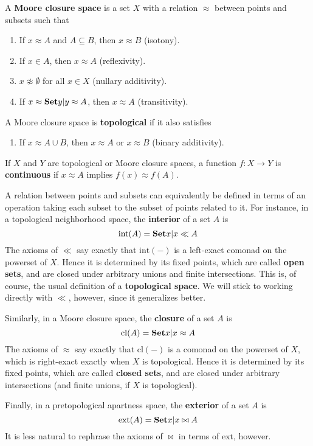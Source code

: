 \documentclass{article}
\def\napprox{\not\approx}
\def\int{\mathrm{int}}
\def\ext{\mathrm{ext}}
\def\cl{\mathrm{cl}}
\begin{document}
\begin{defn}
  A \textbf{Moore closure space} is a set $X$ with a relation $\approx$ between points and subsets such that
  \begin{enumerate}
  \item If $x\approx A$ and $A\subseteq B$, then $x\approx B$ (isotony).
  \item If $x\in A$, then $x\approx A$ (reflexivity).
  \item $x\napprox \emptyset$ for all $x\in X$ (nullary additivity).
  \item If $x\approx \setof{ y | y\approx A}$, then $x\approx A$ (transitivity).
  \end{enumerate}
  A Moore closure space is \textbf{topological} if it also satisfies
  \begin{enumerate}[resume]
  \item If $x\approx A\cup B$, then $x\approx A$ or $x\approx B$ (binary additivity).
  \end{enumerate}
  If $X$ and $Y$ are topological or Moore closure spaces, a function $f:X\to Y$ is \textbf{continuous} if $x\approx A$ implies $f(x) \approx f(A)$.
\end{defn}

A relation between points and subsets can equivalently be defined in terms of an operation taking each subset to the subset of points related to it.
For instance, in a topological neighborhood space, the \textbf{interior} of a set $A$ is
\[ \int(A) = \setof{ x | x\ll A } \]
The axioms of $\ll$ say exactly that $\int(-)$ is a left-exact comonad on the powerset of $X$.
Hence it is determined by its fixed points, which are called \textbf{open sets}, and are closed under arbitrary unions and finite intersections.
This is, of course, the usual definition of a \textbf{topological space}.
We will stick to working directly with $\ll$, however, since it generalizes better.

Similarly, in a Moore closure space, the \textbf{closure} of a set $A$ is
\[ \cl(A) = \setof{x | x \approx A } \]
The axioms of $\approx$ say exactly that $\cl(-)$ is a comonad on the powerset of $X$, which is right-exact exactly when $X$ is topological.
Hence it is determined by its fixed points, which are called \textbf{closed sets}, and are closed under arbitrary intersections (and finite unions, if $X$ is topological).

Finally, in a pretopological apartness space, the \textbf{exterior} of a set $A$ is
\[ \ext(A) = \setof{ x | x\bowtie A } \]
It is less natural to rephrase the axioms of $\bowtie$ in terms of $\ext$, however.
\end{document}
